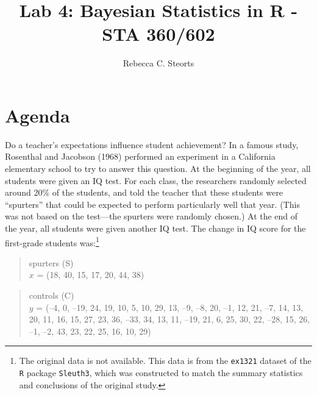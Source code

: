 \documentclass{article}
\begin{document}
\title{Lab 4: Bayesian Statistics in \textsf{R} - STA 360/602}
\author{Rebecca C. Steorts}
\date{}
\maketitle


\section{Agenda}
Do a teacher's expectations influence student achievement? In a famous study, Rosenthal and Jacobson (1968) performed an experiment in a California elementary school to try to answer this question. At the beginning of the year, all students were given an IQ test.  For each class, the researchers randomly selected around 20\% of the students, and told the teacher that these students were ``spurters'' that could be expected to perform particularly well that year. (This was not based on the test---the spurters were randomly chosen.) At the end of the year, all students were given another IQ test. The change in IQ score for the first-grade students was:\footnote{The original data is not available. This data is from the \texttt{ex1321} dataset of the \texttt{R} package \texttt{Sleuth3}, which was constructed to match the summary statistics and conclusions of the original study.}

\begin{quote}
spurters (S)\\
$x$ = (18, 40, 15, 17, 20, 44, 38)
\end{quote}
\begin{quote}
controls (C)\\
$y$ = (--4, 0, --19, 24, 19, 10, 5, 10, 29, 13, --9, --8, 20, --1, 12, 21, --7, 14,
     13, 20, 11, 16, 15, 27, 23, 36, --33, 34, 13, 11, --19, 21, 6, 25, 30,
     22, --28, 15, 26, --1, --2, 43, 23, 22, 25, 16, 10, 29)
\end{quote}
\end{document}

